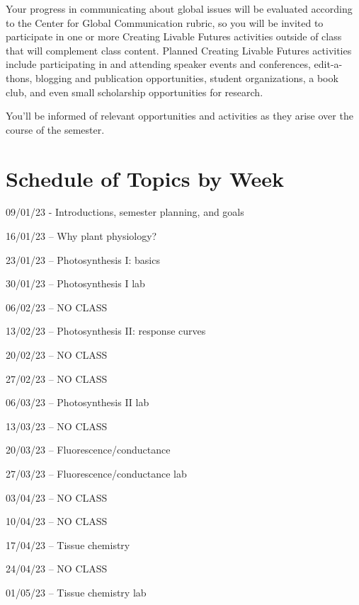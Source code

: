 \documentclass[12pt, notitlepage]{article}   	%
\begin{document}
{Your progress in communicating about global issues will be evaluated according to the 
Center for Global Communication rubric, so you will be invited to participate 
in one or more Creating Livable Futures activities outside of class that will 
complement class content. 
Planned Creating Livable Futures activities include participating in and attending 
speaker events and conferences, edit-a-thons, blogging and publication opportunities, 
student organizations, a book club, and even small scholarship opportunities for research. 

You’ll be informed of relevant opportunities and activities as they arise over 
the course of the semester.

\newpage

\section*{Schedule of Topics by Week}
09/01/23 - Introductions, semester planning, and goals \par
16/01/23 – Why plant physiology? \par
23/01/23 – Photosynthesis I: basics \par
30/01/23 – Photosynthesis I lab \par
06/02/23 – NO CLASS \par
13/02/23 – Photosynthesis II: response curves \par
20/02/23 – NO CLASS \par
27/02/23 – NO CLASS \par
06/03/23 – Photosynthesis II lab \par
13/03/23 – NO CLASS \par
20/03/23 – Fluorescence/conductance \par
27/03/23 – Fluorescence/conductance lab \par
03/04/23 – NO CLASS \par
10/04/23 – NO CLASS \par
17/04/23 – Tissue chemistry \par
24/04/23 – NO CLASS \par
01/05/23 – Tissue chemistry lab \par

} %
\end{document}
